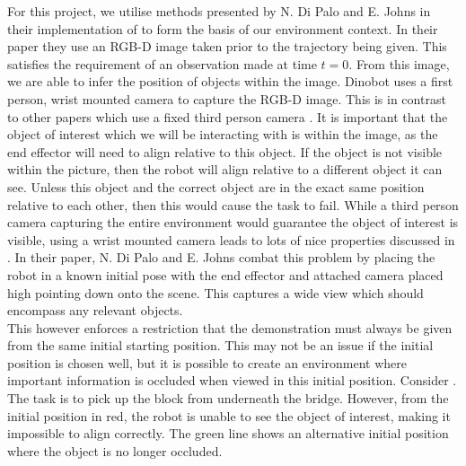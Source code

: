 For this project, we utilise methods presented by N. Di Palo and E. Johns in their implementation of  \cite{one-shot-imitation} to form the basis of our environment context. In their paper they use an RGB-D image taken prior to the trajectory being given. This satisfies the requirement of an observation made at time $t=0$. From this image, we are able to infer the position of objects within the image. Dinobot uses a first person, wrist mounted camera to capture the RGB-D image. This is in contrast to other papers which use a fixed third person camera \cite{one-shot-pose-estimate}.
It is important that the object of interest which we will be interacting with is within the image, as the end effector will need to align relative to this object. If the object is not visible within the picture, then the robot will align relative to a different object it can see. Unless this object and the correct object are in the exact same position relative to each other, then this would cause the task to fail. 
While a third person camera capturing the entire environment would guarantee the object of interest is visible, using a wrist mounted camera leads to lots of nice properties discussed in . In their paper, N. Di Palo and E. Johns combat this problem by placing the robot in a known initial pose with the end effector and attached camera placed high pointing down onto the scene. This captures a wide view which should encompass any relevant objects.\\

This however enforces a restriction that the demonstration must always be given from the same initial starting position. This may not be an issue if the initial position is chosen well, but it is possible to create an environment where important information is occluded when viewed in this initial position. Consider . The task is to pick up the block from underneath the bridge. However, from the initial position in red, the robot is unable to see the object of interest, making it impossible to align correctly. The green line shows an alternative initial position where the object is no longer occluded.

